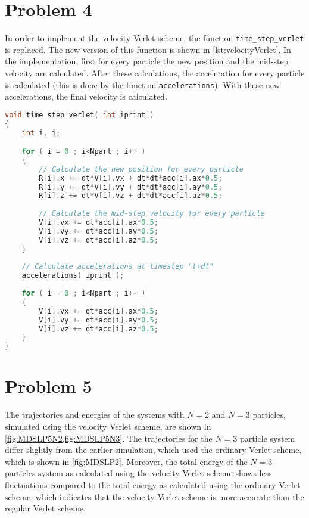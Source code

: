 \documentclass[titlepage]{report}
\begin{document}
\section{Problem 4}
In order to implement the velocity Verlet scheme, the function \lstinline[basicstyle=\ttfamily]|time_step_verlet| is replaced. 
The new version of this function is shown in \cref{lst:velocityVerlet}. 
In the implementation, first for every particle the new position and the mid-step velocity are calculated.
After these calculations, the acceleration for every particle is calculated (this is done by the function \lstinline[basicstyle=\ttfamily]|accelerations|).
With these new accelerations, the final velocity is calculated.

\begin{lstlisting}[language = C, basicstyle=\ttfamily\small,  caption = {Implementation of the velocity Verlet scheme}, label = {lst:velocityVerlet}]
void time_step_verlet( int iprint )
{
	int i, j;

	for ( i = 0 ; i<Npart ; i++ )
	{
		// Calculate the new position for every particle
		R[i].x += dt*V[i].vx + dt*dt*acc[i].ax*0.5;
		R[i].y += dt*V[i].vy + dt*dt*acc[i].ay*0.5;
		R[i].z += dt*V[i].vz + dt*dt*acc[i].az*0.5;
		
		// Calculate the mid-step velocity for every particle
		V[i].vx += dt*acc[i].ax*0.5;
		V[i].vy += dt*acc[i].ay*0.5;
		V[i].vz += dt*acc[i].az*0.5;
	}
	
	// Calculate accelerations at timestep "t+dt"
	accelerations( iprint );  
	
	for ( i = 0 ; i<Npart ; i++ )
	{
		V[i].vx += dt*acc[i].ax*0.5;
		V[i].vy += dt*acc[i].ay*0.5;
		V[i].vz += dt*acc[i].az*0.5;
	}
}
\end{lstlisting}

\section{Problem 5}
The trajectories and energies of the systems with $ N = 2 $ and $ N = 3 $ particles, simulated using the velocity Verlet scheme, are shown in \cref{fig:MDSLP5N2,fig:MDSLP5N3}.
The trajectories for the $ N = 3 $ particle system differ slightly from the earlier simulation, which used the ordinary Verlet scheme, which is shown in \cref{fig:MDSLP2}.
Moreover, the total energy of the $ N = 3 $ particles system as calculated using the velocity Verlet scheme shows less fluctuations compared to the total energy as calculated using the ordinary Verlet scheme, which indicates that the velocity Verlet scheme is more accurate than the regular Verlet scheme.
\end{document}
